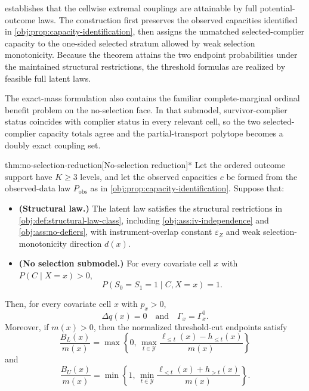 \documentclass[11pt]{article}
\begin{document}
 establishes that the cellwise extremal couplings are attainable by full potential-outcome laws. The construction first preserves the observed capacities identified in \cref{obj:prop:capacity-identification}, then assigns the unmatched selected-complier capacity to the one-sided selected stratum allowed by weak selection monotonicity. Because the theorem attains the two endpoint probabilities under the maintained structural restrictions, the threshold formulas are realized by feasible full latent laws.

The exact-mass formulation also contains the familiar complete-marginal ordinal benefit problem on the no-selection face. In that submodel, survivor-complier status coincides with complier status in every relevant cell, so the two selected-complier capacity totals agree and the partial-transport polytope becomes a doubly exact coupling set.

\begin{theoremv}{thm:no-selection-reduction}[No-selection reduction]*
Let the ordered outcome support have \(K\ge 3\) levels, and let the observed capacities \(c\) be formed from the observed-data law \(P_{\mathrm{obs}}\) as in \cref{obj:prop:capacity-identification}. Suppose that:
\begin{itemize}
\item \textbf{(Structural law.)} The latent law satisfies the structural restrictions in \cref{obj:def:structural-law-class}, including \cref{obj:ass:iv-independence} and \cref{obj:ass:no-defiers}, with instrument-overlap constant \(\varepsilon_Z\) and weak selection-monotonicity direction \(d(x)\).
\item \textbf{(No selection submodel.)} For every covariate cell \(x\) with \(P(C\mid X=x)>0\),
\[
P(S_0=S_1=1\mid C,X=x)=1 .
\]
\end{itemize}
Then, for every covariate cell \(x\) with \(p_x>0\),
\[
\Delta q(x)=0
\quad\text{and}\quad
\Gamma_x=\Gamma_x^{0}.
\]
Moreover, if \(m(x)>0\), then the normalized threshold-cut endpoints satisfy
\[
\frac{B_L(x)}{m(x)}
=
\max\left\{
0,\,
\max_{t\in\mathcal Y}
\frac{\ell_{\le t}(x)-h_{\le t}(x)}{m(x)}
\right\}
\]
and
\[
\frac{B_U(x)}{m(x)}
=
\min\left\{
1,\,
\min_{t\in\mathcal Y}
\frac{\ell_{<t}(x)+h_{>t}(x)}{m(x)}
\right\} .
\]
\end{theoremv}
\end{document}
